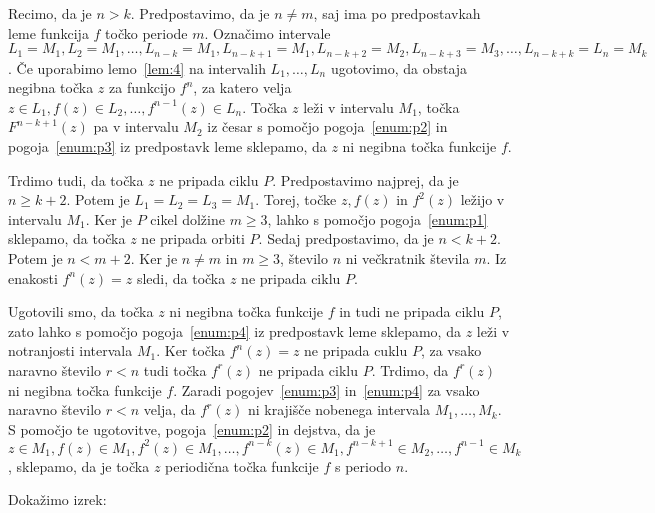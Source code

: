 \documentclass[../TG_magistrsko_delo_sections.tex]{subfiles}
\begin{document}
\begin{dokaz}
Recimo, da je $n>k$. Predpostavimo, da je $n \neq m$, saj ima po predpostavkah leme funkcija $f$ točko periode $m$. Označimo intervale $L_1 = M_1, L_2 = M_1, \dots, L_{n-k} = M_1, L_{n-k+1} = M_1, L_{n-k+2} = M_2,  L_{n-k+3} = M_3, \dots, L_{n-k+k} =L_n =M_k$. Če uporabimo lemo~\ref{lem:4} na intervalih $L_1, \dots, L_n$ ugotovimo, da obstaja negibna točka $z$ za funkcijo $f^n$, za katero velja $z \in L_1, f(z) \in L_2, \dots, f^{n-1}(z) \in L_{n}$. Točka $z$ leži v intervalu $M_1$, točka $F^{n-k+1}(z)$ pa v intervalu $M_2$ iz česar s pomočjo pogoja~\ref{enum:p2} in pogoja~\ref{enum:p3} iz predpostavk leme sklepamo, da $z$ ni negibna točka funkcije $f$. 

Trdimo tudi, da točka $z$ ne pripada ciklu $P$. Predpostavimo najprej, da je $n \geq k + 2$. Potem je $L_1 =L_2 = L_3 = M_1$. Torej, točke $z, f(z)$ in $f^2(z)$ ležijo v intervalu $M_1$. Ker je $P$ cikel dolžine $m \geq 3$, lahko s pomočjo pogoja~\ref{enum:p1} sklepamo, da točka $z$ ne pripada orbiti $P$. Sedaj predpostavimo, da je $n < k+2$. Potem je $n < m+2$. Ker je $n\neq m$ in $m \geq 3$, število $n$ ni večkratnik števila $m$. Iz enakosti $f^n(z) = z$ sledi, da točka $z$ ne pripada ciklu $P$.

Ugotovili smo, da točka $z$ ni negibna točka funkcije $f$ in tudi ne pripada ciklu $P$, zato lahko s pomočjo pogoja~\ref{enum:p4} iz predpostavk leme sklepamo, da $z$ leži v notranjosti intervala $M_1$. Ker točka $f^n(z) = z$ ne pripada cuklu $P$, za vsako naravno število $r < n$ tudi točka $f^r(z)$ ne pripada ciklu $P$. Trdimo, da $f^r(z)$ ni negibna točka funkcije $f$. Zaradi pogojev~\ref{enum:p3} in~\ref{enum:p4} za vsako naravno število $r < n$ velja, da $f^r(z)$ ni krajišče nobenega intervala $M_1, \dots, M_k$. S pomočjo te ugotovitve, pogoja~\ref{enum:p2} in dejstva, da je $z \in M_1, f(z) \in M_1, f^2(z) \in M_1, \dots, f^{n-k}(z) \in M_1, f^{n-k+1} \in M_2, \dots, f^{n-1} \in M_k$, sklepamo, da je točka $z$ periodična točka funkcije $f$ s periodo $n$.
\end{dokaz}


Dokažimo izrek:
\end{document}
